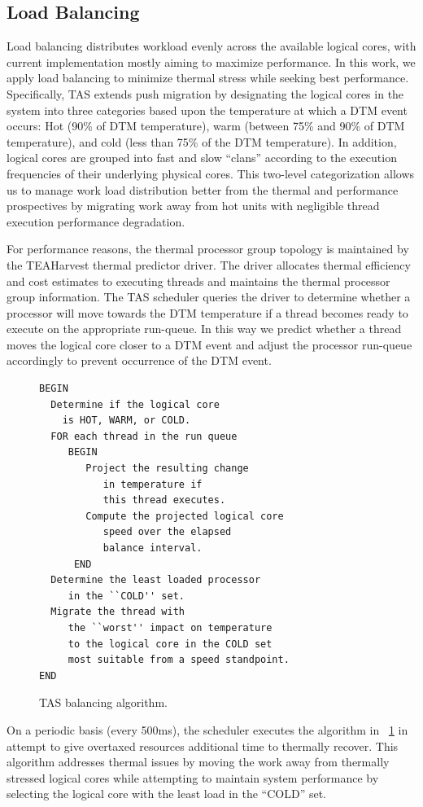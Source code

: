 \documentclass[times, 10pt,twocolumn]{IEEEtran}
\begin{document}
\subsection{Load Balancing}
\label{sec:loadbalance} Load balancing distributes workload evenly
across the available logical cores, with current implementation mostly
aiming to maximize performance.
In this work, we apply load balancing to minimize thermal stress
while seeking best performance.
Specifically, TAS extends push migration by designating the logical cores
in the system into three categories based upon the temperature at which
a DTM event occurs: Hot (90\% of DTM temperature), warm (between 75\%
and 90\% of DTM temperature), and cold (less than 75\% of the DTM temperature).  
In addition, logical cores are grouped into fast and slow ``clans''
according to the execution frequencies of their underlying physical cores.
This two-level categorization allows us to manage
work load distribution better from the thermal and performance prospectives by
migrating work away from hot units with negligible thread execution performance degradation.

For performance reasons, the thermal processor group topology is
maintained by the TEAHarvest thermal predictor driver.  The driver
allocates thermal efficiency and cost estimates to executing threads and
maintains the thermal processor group information. The TAS scheduler
queries the driver to determine whether a processor will move towards
the DTM temperature if a thread becomes ready to execute on the
appropriate run-queue.  In this way we predict whether a thread moves
the logical core closer to a DTM event and adjust the processor
run-queue accordingly to prevent occurrence of the DTM event.

\begin{figure}[t] 
\centering
\begin{verbatim} 
BEGIN 
  Determine if the logical core 
    is HOT, WARM, or COLD.  
  FOR each thread in the run queue 
     BEGIN 
        Project the resulting change 
           in temperature if 
           this thread executes.  
        Compute the projected logical core 
           speed over the elapsed 
           balance interval.  
      END 
  Determine the least loaded processor 
     in the ``COLD'' set.  
  Migrate the thread with 
     the ``worst'' impact on temperature 
     to the logical core in the COLD set
     most suitable from a speed standpoint.  
END
\end{verbatim}
\caption{TAS balancing algorithm.}
\label{fig:tascode}
\end{figure} 
On a periodic basis (every 500ms), the scheduler executes
the algorithm in \figurename~\ref{fig:tascode} in attempt to give
overtaxed resources additional time to thermally recover.  This
algorithm addresses thermal issues by moving the work away from
thermally stressed logical cores while attempting to maintain
system performance by selecting the logical core with the least
load in the ``COLD'' set.
\end{document}
